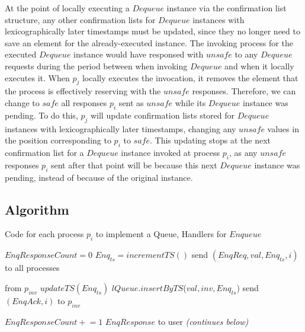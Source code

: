 \documentclass[a4paper,anonymous,USenglish]{lipics-v2021} %
\theoremstyle{definition}
\newcommand{\pluseq}{\mathrel{+}=}
\begin{document}
At the point of locally executing a $Dequeue$ instance via the confirmation list structure, any other confirmation lists for $Dequeue$ instances with lexicographically later timestamps must be updated, since they no longer need to save an element for the already-executed instance.  The invoking process for the executed $Dequeue$ instance would have responsed with $unsafe$ to any $Dequeue$ requests during the period between when invoking $Dequeue$ and when it locally executes it.  When $p_j$ locally executes the invocation, it removes the element that the process is effectively reserving with the $unsafe$ responses. Therefore, we can change to $safe$ all responses $p_i$ sent as $unsafe$ while its $Dequeue$ instance was pending.  To do this, $p_j$ will update confirmation lists stored for $Dequeue$ instances with lexicographically later timestamps, changing any $unsafe$ values in the position corresponding to $p_i$ to $safe$.  This updating stops at the next confirmation list for a $Dequeue$ instance invoked at process $p_i$, as any $unsafe$ responses $p_i$ sent after that point will be because this next $Dequeue$ instance was pending, instead of because of the original instance.

\subsection{Algorithm}

\begin{algorithm}
  \caption{Code for each process $p_i$ to implement a Queue, Handlers for $Enqueue$}\label{alg:fifo}
  \begin{algorithmic}[1]
      \State $EnqResponseCount = 0$ 
      \State $Enq_{ts} = incrementTS()$ \label{fifoline:enqTS} 
      \State send $(EnqReq, val, Enq_{ts}, i)$ to all processes\label{fifoline:sendEnqReq}
    \EndFunction

     from $p_{inv}$
      \State $updateTS(Enq_{ts})$ \label{fifoline:enqReqTSUpdate} 
      \State $lQueue.insertByTS$($val, inv, Enq_{ts}$)\label{fifoline:executeEnq} 
      \State send $(EnqAck, i)$ to $p_{inv}$ \label{fifoline:sendEnqAck} 
    \EndFunction

      \State $EnqResponseCount \pluseq 1$
        \Return $EnqResponse$ to user\label{fifoline:enqReturn} 
      \EndIf
    \EndFunction
    \Statex
    \Statex \emph{(continues below)}
  \end{algorithmic}
\end{algorithm}
\end{document}
